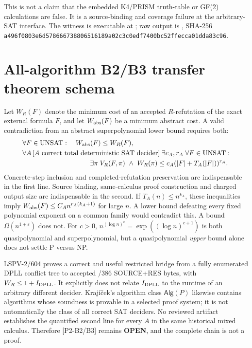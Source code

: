 \documentclass[11pt]{article}
\begin{document}
This is not a claim that the embedded K4/PRISM truth-table or GF(2) calculations are false. It is a source-binding and coverage failure at the arbitrary-SAT interface. The witness is executable at ; raw output is , SHA-256 \texttt{a496f0803e6d578666738806516189a02c3c0edf7400bc52ffecca01dda83c96}.

\section*{All-algorithm B2/B3 transfer theorem schema}
Let $W_R(F)$ denote the minimum cost of an accepted $R$-refutation of the exact external formula $F$, and let $W_{\rm abs}(F)$ be a minimum abstract cost. A valid contradiction from an abstract superpolynomial lower bound requires both:
\begin{align*}
&\forall F\in\mathrm{UNSAT}:\quad W_{\rm abs}(F)\le W_R(F),\\
&\forall A\,[A\text{ correct total deterministic SAT decider}]\;\exists c_A,r_A\;\forall F\in\mathrm{UNSAT}:\\
&\hspace{35mm}\exists\pi\;V_R(F,\pi)\ \wedge\ W_R(\pi)\le c_A(|F|+T_A(|F|))^{r_A}.
\end{align*}
Concrete-step inclusion and completed-refutation preservation are indispensable in the first line. Source binding, same-calculus proof construction and charged output size are indispensable in the second. If $T_A(n)\le n^{k_A}$, these inequalities imply $W_{\rm abs}(F)\le C_A n^{r_A(k_A+1)}$ for large $n$. A lower bound defeating every fixed polynomial exponent on a common family would contradict this. A bound $\Omega(n^{1+\varepsilon})$ does not. For $c>0$, $n^{(\log n)^c}=\exp((\log n)^{c+1})$ is both quasipolynomial and superpolynomial, but a quasipolynomial \emph{upper} bound alone does not settle P versus NP.

LSPV-2/604 proves a correct and useful restricted bridge from a fully enumerated DPLL conflict tree to accepted /386 SOURCE+RES bytes, with $W_R\le1+I_{\rm DPLL}$. It explicitly does not relate $I_{\rm DPLL}$ to the runtime of an arbitrary different decider. Kraj\'i\v cek's algorithm class $\mathsf{Alg}(P)$ likewise contains algorithms whose soundness is provable in a selected proof system; it is not automatically the class of all correct SAT deciders. No reviewed artifact establishes the quantified second line for every $A$ in the same historical mixed calculus. Therefore [P2-B2/B3] remains \textbf{OPEN}, and the complete chain is not a proof.
\end{document}
